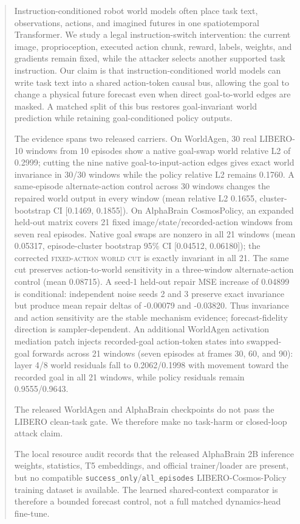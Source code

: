 \documentclass[10pt]{article}
\newcommand{\cut}{\textsc{fixed-action world cut}}
\begin{document}
\begin{abstract}
Instruction-conditioned robot world models often place task text, observations, actions, and imagined futures in one spatiotemporal Transformer. We study a legal instruction-switch intervention: the current image, proprioception, executed action chunk, reward, labels, weights, and gradients remain fixed, while the attacker selects another supported task instruction. Our claim is that instruction-conditioned world models can write task text into a shared action-token causal bus, allowing the goal to change a physical future forecast even when direct goal-to-world edges are masked. A matched split of this bus restores goal-invariant world prediction while retaining goal-conditioned policy outputs.

The evidence spans two released carriers. On WorldAgen, 30 real LIBERO-10 windows from 10 episodes show a native goal-swap world relative L2 of 0.2999; cutting the nine native goal-to-input-action edges gives exact world invariance in 30/30 windows while the policy relative L2 remains 0.1760. A same-episode alternate-action control across 30 windows changes the repaired world output in every window (mean relative L2 0.1655, cluster-bootstrap CI [0.1469, 0.1855]). On AlphaBrain CosmosPolicy, an expanded held-out matrix covers 21 fixed image/state/recorded-action windows from seven real episodes. Native goal swaps are nonzero in all 21 windows (mean 0.05317, episode-cluster bootstrap 95\% CI [0.04512, 0.06180]); the corrected \cut{} is exactly invariant in all 21. The same cut preserves action-to-world sensitivity in a three-window alternate-action control (mean 0.08715). A seed-1 held-out repair MSE increase of 0.04899 is conditional: independent noise seeds 2 and 3 preserve exact invariance but produce mean repair deltas of -0.00079 and -0.03820. Thus invariance and action sensitivity are the stable mechanism evidence; forecast-fidelity direction is sampler-dependent.
An additional WorldAgen activation mediation patch injects recorded-goal action-token states into swapped-goal forwards across 21 windows (seven episodes at frames 30, 60, and 90): layer 4/8 world residuals fall to 0.2062/0.1998 with movement toward the recorded goal in all 21 windows, while policy residuals remain 0.9555/0.9643.

The released WorldAgen and AlphaBrain checkpoints do not pass the LIBERO clean-task gate. We therefore make no task-harm or closed-loop attack claim.

The local resource audit records that the released AlphaBrain 2B inference weights, statistics, T5 embeddings, and official trainer/loader are present, but no compatible \texttt{success\_only}/\texttt{all\_episodes} LIBERO-Cosmos-Policy training dataset is available. The learned shared-context comparator is therefore a bounded forecast control, not a full matched dynamics-head fine-tune.
\end{abstract}
\end{document}
